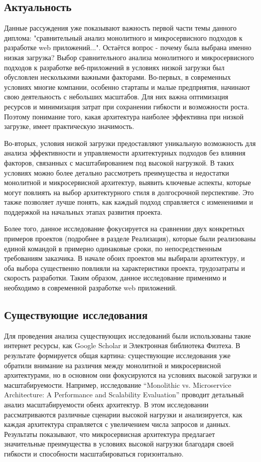 \subsection{Актуальность}
    
    Данные рассуждения уже показывают важность первой части темы данного диплома: "сравнительный анализ монолитного и микросервисного подходов к разработке web приложений...". Остаётся вопрос - почему была выбрана именно низкая загрузка? Выбор сравнительного анализа монолитного и микросервисного подходов к разработке веб-приложений в условиях низкой загрузки был обусловлен несколькими важными факторами. Во-первых, в современных условиях многие компании, особенно стартапы и малые предприятия, начинают свою деятельность с небольших масштабов. Для них важна оптимизация ресурсов и минимизация затрат при сохранении гибкости и возможности роста. Поэтому понимание того, какая архитектура наиболее эффективна при низкой загрузке, имеет практическую значимость.

    Во-вторых, условия низкой загрузки предоставляют уникальную возможность для анализа эффективности и управляемости архитектурных подходов без влияния факторов, связанных с масштабированием под высокой нагрузкой. В таких условиях можно более детально рассмотреть преимущества и недостатки монолитной и микросервисной архитектур, выявить ключевые аспекты, которые могут повлиять на выбор архитектурного стиля в долгосрочной перспективе. Это также позволяет лучше понять, как каждый подход справляется с изменениями и поддержкой на начальных этапах развития проекта.

    Более того, данное исследование фокусируется на сравнении двух конкретных примеров проектов (подробнее в разделе Реализация), которые были реализованы единой командой в примерно одинаковые сроки, по непосредственным требованиям заказчика. В начале обоих проектов мы выбирали архитектуру, и оба выбора существенно повлияли на характеристики проекта, трудозатраты и скорость разработки. Таким образом, данное исследование применимо и необходимо в современной разработке web приложений.

\subsection{Существующие исследования}
    Для проведения анализа существующих исследований были использованы такие интернет ресурсы, как Google Scholar и Электронная библиотека Физтеха. В результате формируется общая картина: существующие исследования уже обратили внимание на различия между монолитной и микросервисной архитектурами, но в основном они фокусируются на условиях высокой загрузки и масштабируемости. Например, исследование “Monolithic vs. Microservice Architecture: A Performance and Scalability Evaluation” \cite{blinowski2022monolithic} проводит детальный анализ масштабируемости обеих архитектур. В этом исследовании рассматриваются различные сценарии высокой нагрузки и анализируется, как каждая архитектура справляется с увеличением числа запросов и данных. Результаты показывают, что микросервисная архитектура предлагает значительные преимущества в условиях высокой нагрузки благодаря своей гибкости и способности масштабироваться горизонтально.

